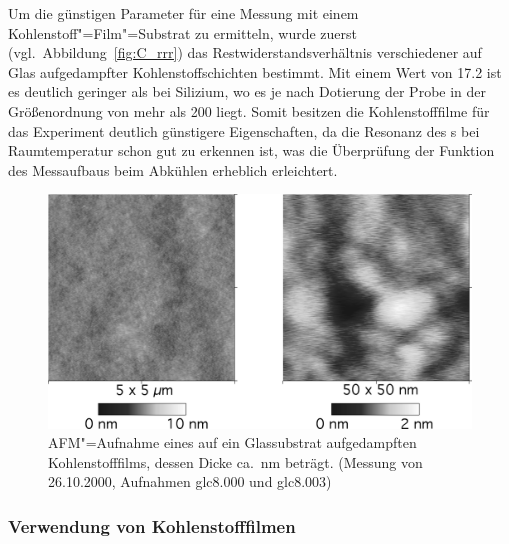 Um die günstigen Parameter für eine Messung mit einem Kohlenstoff"=Film"=Substrat zu ermitteln, wurde zuerst (vgl.\ Abbildung~\ref{fig:C_rrr}) das Restwiderstandsverhältnis verschiedener auf Glas aufgedampfter Kohlenstoffschichten bestimmt. Mit einem Wert von 17.2 ist es deutlich geringer als bei Silizium, wo es je nach Dotierung der Probe in der Größenordnung von mehr als 200 liegt. Somit besitzen die Kohlenstofffilme für das Experiment deutlich günstigere Eigenschaften, da die Resonanz des \HR s bei Raumtemperatur schon gut zu erkennen ist, was die Überprüfung der Funktion des Messaufbaus beim Abkühlen erheblich erleichtert.

\begin{figure}[h!tbp]
	\includegraphics{exp_substrate/CGlas_AFM}
	\begin{minipage}[b]{\linewidth-\tabcolsep-10.3cm}
	\caption[AFM"=Aufnahme eines auf ein Glassubstrat aufgedampften Kohlenstofffilms]{AFM"=Aufnahme eines auf ein Glassubstrat aufgedampften Kohlenstofffilms, dessen Dicke ca.\ \unit[15]{nm} beträgt. (Messung von 26.10.2000, Aufnahmen glc8.000 und glc8.003)}
	\label{fig:afm_c}
	\end{minipage}
\end{figure}

\subsubsection{Verwendung von Kohlenstofffilmen}

